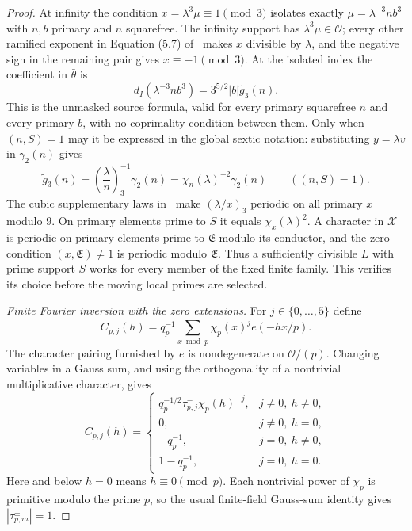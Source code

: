 \documentclass[11pt,a4paper]{article}
\numberwithin{equation}{section}
\numberwithin{figure}{section}
\theoremstyle{definition}
\theoremstyle{remark}
\begin{document}
\begin{proof}
At infinity the condition $x=\lambda^3\mu\equiv1\pmod3$ isolates
exactly $\mu=\lambda^{-3}nb^3$ with $n,b$ primary and $n$ squarefree.
The infinity support has $\lambda^3\mu\in\mathcal O$; every other ramified
exponent in Equation (5.7) of~\cite{DR}
makes $x$ divisible by $\lambda$, and the negative sign in the remaining
pair gives $x\equiv-1\pmod3$.  At the isolated index the coefficient in
$\bar\theta$ is
\begin{equation}\label{eq:reflection-infinity-coefficient}
 d_I(\lambda^{-3}nb^3)=3^{5/2}|b|\widetilde g_3(n).
\end{equation}
This is the unmasked source formula, valid for every primary squarefree $n$
and every primary $b$, with no coprimality condition between them.  Only when
$(n,S)=1$ may it be expressed in the global sextic notation: substituting
$y=\lambda v$ in $\gamma_2(n)$ gives
\begin{equation}\label{eq:reflection-cubic-sextic-conversion}
 \widetilde g_3(n)=\left(\frac\lambda n\right)_3^{-1}\gamma_2(n)
       =\chi_n(\lambda)^{-2}\gamma_2(n)\qquad((n,S)=1).
\end{equation}
The cubic supplementary laws in~\cite[Equation (1.5)]{DR} make
$(\lambda/x)_3$ periodic on all primary $x$ modulo $9$.  On primary
elements prime to $S$ it equals $\chi_x(\lambda)^2$.  A character in $\mathcal X$ is
periodic on primary elements prime to $\mathfrak E$ modulo its conductor, and the
zero condition $(x,\mathfrak E)\ne1$ is periodic modulo $\mathfrak E$.
Thus a sufficiently divisible $L$ with prime support $S$ works for every
member of the fixed finite family.  This verifies its choice before the
moving local primes are selected.

\emph{Finite Fourier inversion with the zero extensions.}
For $j\in\{0,\ldots,5\}$ define
\[
 C_{p,j}(h)=q_p^{-1}\sum_{x\bmod p}\chi_p(x)^j e(-hx/p).
\]
The character pairing furnished by $e$ is nondegenerate on
$\mathcal O/(p)$.  Changing variables in a Gauss sum, and using the
orthogonality of a nontrivial multiplicative character, gives
\begin{equation}\label{eq:reflection-local-fourier}
 C_{p,j}(h)=\begin{cases}
 q_p^{-1/2}\tau_{p,j}^{-}\chi_p(h)^{-j},&j\ne0,\ h\ne0,\\
 0,&j\ne0,\ h=0,\\
 -q_p^{-1},&j=0,\ h\ne0,\\
 1-q_p^{-1},&j=0,\ h=0.
 \end{cases}
\end{equation}
Here and below $h=0$ means $h\equiv0\pmod p$.  Each nontrivial power of
$\chi_p$ is primitive modulo the prime $p$, so the usual finite-field
Gauss-sum identity gives $|\tau_{p,m}^{\pm}|=1$.


\end{proof}
\end{document}
